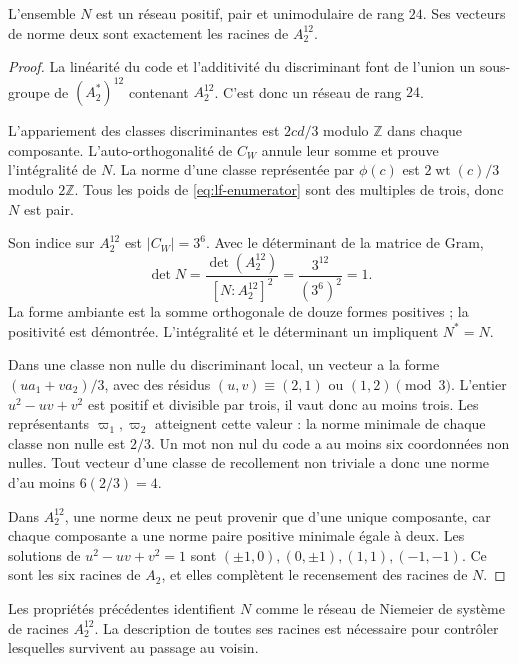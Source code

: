 \begin{theorem}
\label{thm:lf-niemeier}
L’ensemble \(N\) est un réseau positif, pair et
unimodulaire de rang \(24\). Ses vecteurs de norme deux
sont exactement les racines de \(A_2^{12}\).
\end{theorem}
\begin{proof}
La linéarité du code et l’additivité du discriminant
font de l’union un sous-groupe de
\((A_2^*)^{12}\) contenant \(A_2^{12}\).
C’est donc un réseau de rang \(24\).

L'appariement des classes discriminantes est \(2cd/3\) modulo \(\mathbb Z\) dans chaque composante. L'auto-orthogonalité de \(C_W\) annule leur somme et prouve l'intégralité de \(N\). La norme d'une classe représentée par \(\phi(c)\) est \(2\operatorname{wt}(c)/3\) modulo \(2\mathbb Z\). Tous les poids de \eqref{eq:lf-enumerator} sont des multiples de trois, donc \(N\) est pair.

Son indice sur \(A_2^{12}\) est \(|C_W|=3^6\).
Avec le déterminant de la matrice de Gram,
\[
 \det N=\frac{\det(A_2^{12})}{[N:A_2^{12}]^2}
       =\frac{3^{12}}{(3^6)^2}=1.
\]
La forme ambiante est la somme orthogonale de douze formes
positives ; la positivité est démontrée.
L’intégralité et le déterminant un impliquent
\(N^*=N\).

Dans une classe non nulle du discriminant local, un
vecteur a la forme \((ua_1+va_2)/3\), avec des résidus
\((u,v)\equiv(2,1)\) ou \((1,2)\pmod3\).
L’entier \(u^2-uv+v^2\) est positif et divisible
par trois, il vaut donc au moins trois. Les représentants
\(\varpi_1,\varpi_2\) atteignent cette valeur : la norme
minimale de chaque classe non nulle est \(2/3\).
Un mot non nul du code a au moins
six coordonnées non nulles. Tout vecteur d’une classe
de recollement non triviale a donc une norme
d’au moins \(6(2/3)=4\).

Dans \(A_2^{12}\), une norme deux ne peut provenir que d'une unique composante, car chaque composante a une norme paire positive minimale égale à deux. Les solutions de \(u^2-uv+v^2=1\) sont \((\pm1,0),(0,\pm1),(1,1),(-1,-1)\). Ce sont les six racines de \(A_2\), et elles complètent le recensement des racines de \(N\).
\end{proof}

Les propriétés précédentes identifient \(N\) comme le
réseau de Niemeier de système de racines \(A_2^{12}\).
La description de toutes ses racines est nécessaire pour
contrôler lesquelles survivent au passage au voisin.

